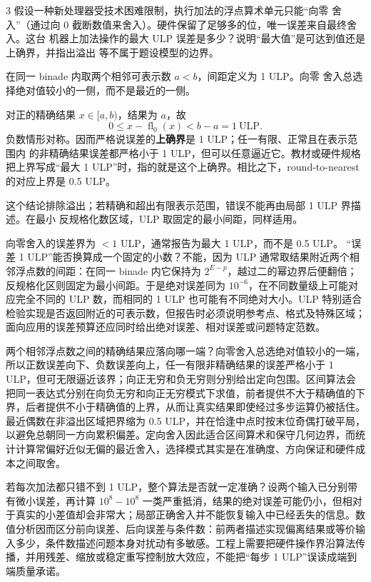 \begin{solutionexercise}{3}
\problemheading 假设一种新处理器受技术困难限制，执行加法的浮点算术单元只能“向零
舍入”（通过向 0 截断数值来舍入）。硬件保留了足够多的位，唯一误差来自最终舍入。这台
机器上加法操作的最大 ULP 误差是多少？说明“最大值”是可达到值还是上确界，并指出溢出
等不属于题设模型的边界。

\approachheading 在同一 binade 内取两个相邻可表示数 $a<b$，间距定义为 1 ULP。向零
舍入总选择绝对值较小的一侧，而不是最近的一侧。

\answerheading 对正的精确结果 $x\in[a,b)$，结果为 $a$，故
\[
  0\le x-\operatorname{fl}_{0}(x)<b-a=1\ \mathrm{ULP}.
\]
负数情形对称。因而严格说误差的\textbf{上确界}是 1 ULP；任一有限、正常且在表示范围内
的非精确结果误差都严格小于 1 ULP，但可以任意逼近它。教材或硬件规格把上界写成“最大
1 ULP”时，指的就是这个上确界。相比之下，round-to-nearest 的对应上界是 0.5 ULP。

这个结论排除溢出；若精确和超出有限表示范围，错误不能再由局部 1 ULP 界描述。在最小
反规格化数区域，ULP 取固定的最小间距，同样适用。

\conclusionheading 向零舍入的误差界为 $<1$ ULP，通常报告为最大 1 ULP，而不是
0.5 ULP。
\discussionheading
{}
“误差 1 ULP”能否换算成一个固定的小数？不能，因为 ULP 通常取结果附近两个相邻浮点数的间距：在同一 binade 内它保持为 $2^{E-p}$，越过二的幂边界后便翻倍；反规格化区则固定为最小间距。于是绝对误差同为 $10^{-6}$，在不同数量级上可能对应完全不同的 ULP 数，而相同的 1 ULP 也可能有不同绝对大小。ULP 特别适合检验实现是否返回附近的可表示数，但报告时必须说明参考点、格式及特殊区域；面向应用的误差预算还应同时给出绝对误差、相对误差或问题特定范数。

两个相邻浮点数之间的精确结果应落向哪一端？向零舍入总选绝对值较小的一端，所以正数误差向下、负数误差向上，任一有限非精确结果的误差严格小于 1 ULP，但可无限逼近该界；向正无穷和负无穷则分别给出定向包围。区间算法会把同一表达式分别在向负无穷和向正无穷模式下求值，前者提供不大于精确值的下界，后者提供不小于精确值的上界，从而让真实结果即使经过多步运算仍被括住。最近偶数在非溢出区域把界缩为 0.5 ULP，并在恰逢中点时按末位奇偶打破平局，以避免总朝同一方向累积偏差。定向舍入因此适合区间算术和保守几何边界，而统计计算常偏好近似无偏的最近舍入，选择模式其实是在准确度、方向保证和硬件成本之间取舍。

若每次加法都只错不到 1 ULP，整个算法是否就一定准确？设两个输入已分别带有微小误差，再计算 $10^8-10^8$ 一类严重抵消，结果的绝对误差可能仍小，但相对于真实的小差值却会非常大；局部正确舍入并不能恢复输入中已经丢失的信息。数值分析因而区分前向误差、后向误差与条件数：前两者描述实现偏离结果或等价输入多少，条件数描述问题本身对扰动有多敏感。工程上需要把硬件操作界沿算法传播，并用残差、缩放或稳定重写控制放大效应，不能把“每步 1 ULP”误读成端到端质量承诺。


\end{solutionexercise}
